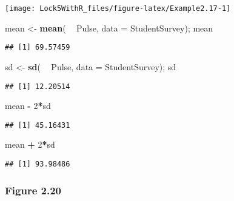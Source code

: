 \documentclass[]{book}
\newenvironment{Shaded}{\begin{snugshade}}{\end{snugshade}}
\newcommand{\DataTypeTok}[1]{\textcolor[rgb]{0.13,0.29,0.53}{#1}}
\newcommand{\DecValTok}[1]{\textcolor[rgb]{0.00,0.00,0.81}{#1}}
\newcommand{\KeywordTok}[1]{\textcolor[rgb]{0.13,0.29,0.53}{\textbf{#1}}}
\newcommand{\NormalTok}[1]{#1}
\newcommand{\OperatorTok}[1]{\textcolor[rgb]{0.81,0.36,0.00}{\textbf{#1}}}
\newcommand{\StringTok}[1]{\textcolor[rgb]{0.31,0.60,0.02}{#1}}
\begin{document}
\texttt{[image: Lock5WithR\_files/figure-latex/Example2.17-1]}

\begin{Shaded}
\begin{Highlighting}[]
\NormalTok{mean <-}\StringTok{ }\KeywordTok{mean}\NormalTok{( }\OperatorTok{~}\StringTok{ }\NormalTok{Pulse, }\DataTypeTok{data =}\NormalTok{ StudentSurvey); mean}
\end{Highlighting}
\end{Shaded}

\begin{verbatim}
## [1] 69.57459
\end{verbatim}

\begin{Shaded}
\begin{Highlighting}[]
\NormalTok{sd <-}\StringTok{ }\KeywordTok{sd}\NormalTok{( }\OperatorTok{~}\StringTok{ }\NormalTok{Pulse, }\DataTypeTok{data =}\NormalTok{ StudentSurvey); sd}
\end{Highlighting}
\end{Shaded}

\begin{verbatim}
## [1] 12.20514
\end{verbatim}

\begin{Shaded}
\begin{Highlighting}[]
\NormalTok{mean }\OperatorTok{-}\StringTok{ }\DecValTok{2}\OperatorTok{*}\NormalTok{sd}
\end{Highlighting}
\end{Shaded}

\begin{verbatim}
## [1] 45.16431
\end{verbatim}

\begin{Shaded}
\begin{Highlighting}[]
\NormalTok{mean }\OperatorTok{+}\StringTok{ }\DecValTok{2}\OperatorTok{*}\NormalTok{sd}
\end{Highlighting}
\end{Shaded}

\begin{verbatim}
## [1] 93.98486
\end{verbatim}

\hypertarget{figure-2.20}{%
\subsubsection{Figure 2.20}\label{figure-2.20}}
\end{document}
